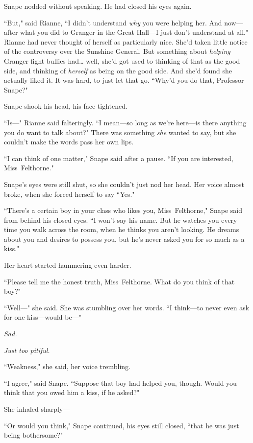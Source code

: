 Snape nodded without speaking. He had closed his eyes again.

``But," said Rianne, ``I didn't understand \emph{why} you were helping her. And now—after what you did to Granger in the Great Hall—I just don't understand at all." Rianne had never thought of herself as particularly nice. She'd taken little notice of the controversy over the Sunshine General. But something about \emph{helping} Granger fight bullies had{\ldots} well, she'd got used to thinking of that as the good side, and thinking of \emph{herself} as being on the good side. And she'd found she actually liked it. It was hard, to just let that go. ``Why'd you do that, Professor Snape?"

Snape shook his head, his face tightened.

``Is—" Rianne said falteringly. ``I mean—so long as we're here—is there anything you do want to talk about?" There was something \emph{she} wanted to say, but she couldn't make the words pass her own lips.

``I can think of one matter," Snape said after a pause. ``If you are interested, Miss~Felthorne."

Snape's eyes were still shut, so she couldn't just nod her head. Her voice almost broke, when she forced herself to say ``Yes."

``There's a certain boy in your class who likes you, Miss~Felthorne," Snape said from behind his closed eyes. ``I won't say his name. But he watches you every time you walk across the room, when he thinks you aren't looking. He dreams about you and desires to possess you, but he's never asked you for so much as a kiss."

Her heart started hammering even harder.

``Please tell me the honest truth, Miss~Felthorne. What do you think of that boy?"

``Well—" she said. She was stumbling over her words. ``I think—to never even ask for one kiss—would be—"

\emph{Sad.}

\emph{Just too pitiful.}

``Weakness," she said, her voice trembling.

``I agree," said Snape. ``Suppose that boy had helped you, though. Would you think that you owed him a kiss, if he asked?"

She inhaled sharply—

``Or would you think," Snape continued, his eyes still closed, ``that he was just being bothersome?"

